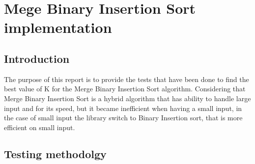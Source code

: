 \section{Mege Binary Insertion Sort implementation}
\subsection{Introduction}
The purpose of this report is to provide the tests that have been done to find the best value of K for the Merge Binary Insertion Sort algorithm.
Considering that Merge Binary Insertion Sort is a hybrid algorithm that has ability to handle large input and for its speed, but it became inefficient when having a small input, in the case of small input the library switch to Binary Insertion sort, that is more efficient on small input.

\subsection{Testing methodolgy}
